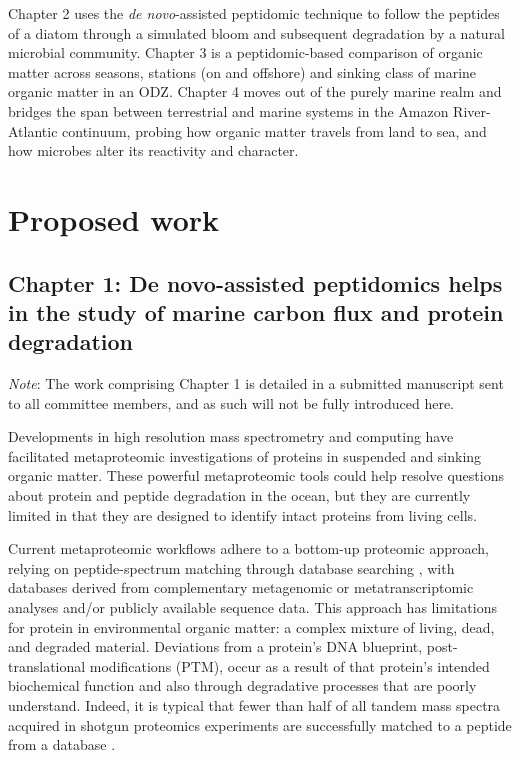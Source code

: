 \documentclass[12pt, letterpaper, twoside]{article}
\begin{document}
Chapter 2 uses the \textit{de novo}-assisted peptidomic technique to follow the peptides of a diatom through a simulated bloom and subsequent degradation by a natural microbial community. Chapter 3 is a peptidomic-based comparison of organic matter across seasons, stations (on and offshore) and sinking class of marine organic matter in an ODZ. Chapter 4 moves out of the purely marine realm and bridges the span between terrestrial and marine systems in the Amazon River-Atlantic continuum, probing how organic matter travels from land to sea, and how microbes alter its reactivity and character.

\newpage

\section{Proposed work}

\subsection{{Chapter 1: De novo}-assisted peptidomics helps in the study of marine carbon flux and protein degradation}

\textit{Note}: The work comprising Chapter 1 is detailed in a submitted manuscript sent to all committee members, and as such will not be fully introduced here. 

Developments in high resolution mass spectrometry and computing have facilitated metaproteomic investigations of proteins in suspended \cite{dong_characterization_2010, bridoux_suspended_2015, bergauer_organic_2017} and sinking \cite{moore_identifying_2012} organic matter. These powerful metaproteomic tools could help resolve questions about protein and peptide degradation in the ocean, but they are currently limited in that they are designed to identify intact proteins from living cells.

Current metaproteomic workflows adhere to a bottom-up proteomic approach, relying on peptide-spectrum matching through database searching \cite{saito_progress_2019}, with databases derived from  complementary metagenomic or metatranscriptomic analyses and/or publicly available sequence data. This approach has limitations for protein in environmental organic matter: a complex mixture of living, dead, and degraded material. Deviations from a protein's DNA blueprint, post-translational modifications (PTM), occur as a result of that protein’s intended biochemical function and also through degradative processes \cite{kim_methionine_2014} that are poorly understand. Indeed, it is typical that fewer than half of all tandem mass spectra acquired in shotgun proteomics experiments are successfully matched to a peptide from a database \cite{chick_mass-tolerant_2015}. 
\end{document}
